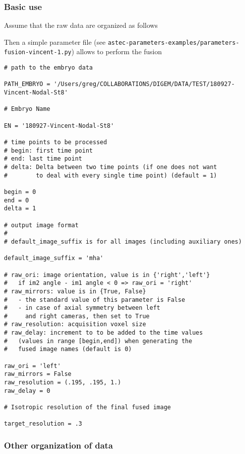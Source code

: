 \subsubsection{Basic use}
\label{sec:cli:fuse:basic:use}
Assume that the raw data are organized as follows

Then a simple parameter file (see \texttt{astec-parameters-examples/parameters-fusion-vincent-1.py}) allows to perform the fusion
\begin{verbatim}
# path to the embryo data

PATH_EMBRYO = '/Users/greg/COLLABORATIONS/DIGEM/DATA/TEST/180927-Vincent-Nodal-St8'

# Embryo Name

EN = '180927-Vincent-Nodal-St8'

# time points to be processed
# begin: first time point
# end: last time point
# delta: Delta between two time points (if one does not want
#        to deal with every single time point) (default = 1)

begin = 0
end = 0
delta = 1

# output image format
#
# default_image_suffix is for all images (including auxiliary ones)

default_image_suffix = 'mha'

# raw_ori: image orientation, value is in {'right','left'}
#   if im2 angle - im1 angle < 0 => raw_ori = 'right'
# raw_mirrors: value is in {True, False}
# 	- the standard value of this parameter is False
# 	- in case of axial symmetry between left
# 	  and right cameras, then set to True
# raw_resolution: acquisition voxel size
# raw_delay: increment to to be added to the time values
#   (values in range [begin,end]) when generating the
#   fused image names (default is 0)

raw_ori = 'left'
raw_mirrors = False
raw_resolution = (.195, .195, 1.)
raw_delay = 0

# Isotropic resolution of the final fused image

target_resolution = .3
\end{verbatim}

\subsubsection{Other organization of data}

